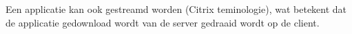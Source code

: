 Een applicatie kan ook gestreamd worden (Citrix teminologie), wat betekent dat de applicatie gedownload wordt van de server gedraaid wordt op de client.

